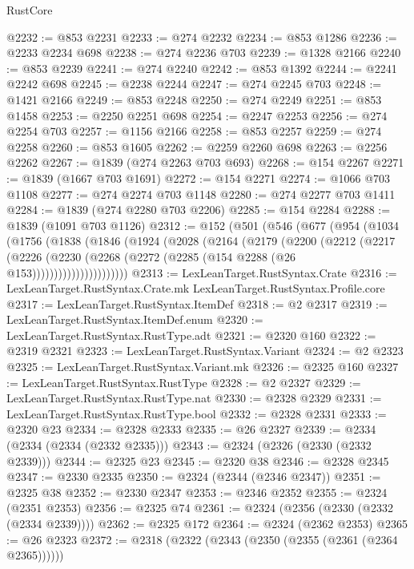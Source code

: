 \begin{lexlean}{RustCore}
\begin{coremodule}
@2232 := @853 @2231
@2233 := @274 @2232
@2234 := @853 @1286
@2236 := @2233 @2234 @698
@2238 := @274 @2236 @703
@2239 := @1328 @2166
@2240 := @853 @2239
@2241 := @274 @2240
@2242 := @853 @1392
@2244 := @2241 @2242 @698
@2245 := @2238 @2244
@2247 := @274 @2245 @703
@2248 := @1421 @2166
@2249 := @853 @2248
@2250 := @274 @2249
@2251 := @853 @1458
@2253 := @2250 @2251 @698
@2254 := @2247 @2253
@2256 := @274 @2254 @703
@2257 := @1156 @2166
@2258 := @853 @2257
@2259 := @274 @2258
@2260 := @853 @1605
@2262 := @2259 @2260 @698
@2263 := @2256 @2262
@2267 := @1839 (@274 @2263 @703 @693)
@2268 := @154 @2267
@2271 := @1839 (@1667 @703 @1691)
@2272 := @154 @2271
@2274 := @1066 @703 @1108
@2277 := @274 @2274 @703 @1148
@2280 := @274 @2277 @703 @1411
@2284 := @1839 (@274 @2280 @703 @2206)
@2285 := @154 @2284
@2288 := @1839 (@1091 @703 @1126)
@2312 := @152
    (@501
      (@546
        (@677
          (@954
            (@1034
              (@1756
                (@1838
                  (@1846
                    (@1924
                      (@2028
                        (@2164
                          (@2179
                            (@2200
                              (@2212
                                (@2217
                                  (@2226
                                    (@2230
                                      (@2268
                                        (@2272 (@2285 (@154 @2288 (@26 @153))))))))))))))))))))))
@2313 := LexLeanTarget.RustSyntax.Crate
@2316 := LexLeanTarget.RustSyntax.Crate.mk LexLeanTarget.RustSyntax.Profile.core
@2317 := LexLeanTarget.RustSyntax.ItemDef
@2318 := @2 @2317
@2319 := LexLeanTarget.RustSyntax.ItemDef.enum
@2320 := LexLeanTarget.RustSyntax.RustType.adt
@2321 := @2320 @160
@2322 := @2319 @2321
@2323 := LexLeanTarget.RustSyntax.Variant
@2324 := @2 @2323
@2325 := LexLeanTarget.RustSyntax.Variant.mk
@2326 := @2325 @160
@2327 := LexLeanTarget.RustSyntax.RustType
@2328 := @2 @2327
@2329 := LexLeanTarget.RustSyntax.RustType.nat
@2330 := @2328 @2329
@2331 := LexLeanTarget.RustSyntax.RustType.bool
@2332 := @2328 @2331
@2333 := @2320 @23
@2334 := @2328 @2333
@2335 := @26 @2327
@2339 := @2334 (@2334 (@2334 (@2332 @2335)))
@2343 := @2324 (@2326 (@2330 (@2332 @2339)))
@2344 := @2325 @23
@2345 := @2320 @38
@2346 := @2328 @2345
@2347 := @2330 @2335
@2350 := @2324 (@2344 (@2346 @2347))
@2351 := @2325 @38
@2352 := @2330 @2347
@2353 := @2346 @2352
@2355 := @2324 (@2351 @2353)
@2356 := @2325 @74
@2361 := @2324 (@2356 (@2330 (@2332 (@2334 @2339))))
@2362 := @2325 @172
@2364 := @2324 (@2362 @2353)
@2365 := @26 @2323
@2372 := @2318 (@2322 (@2343 (@2350 (@2355 (@2361 (@2364 @2365))))))

\end{coremodule}
\end{lexlean}
